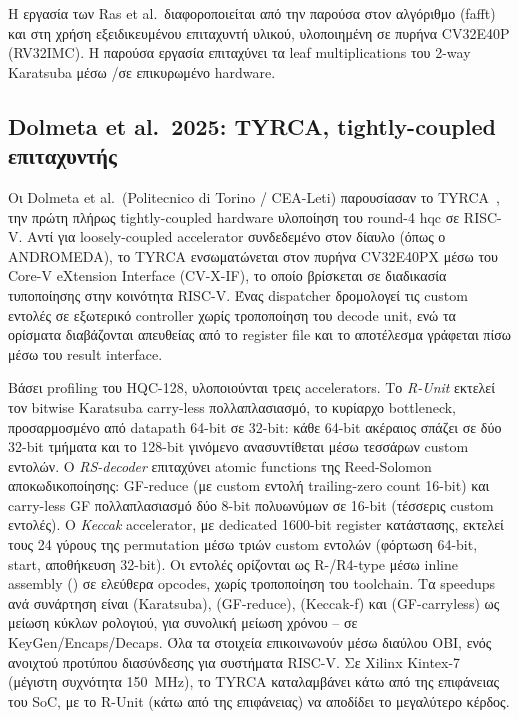 Η εργασία των Ras et al.\ διαφοροποιείται από την παρούσα στον αλγόριθμο (\gls{fafft}) και στη
χρήση εξειδικευμένου επιταχυντή υλικού, υλοποιημένη σε πυρήνα CV32E40P
(RV32IMC). Η παρούσα εργασία επιταχύνει τα leaf multiplications του 2-way
Karatsuba μέσω /\vclmul σε επικυρωμένο hardware.

\subsection{Dolmeta et al.\ 2025: TYRCA, tightly-coupled επιταχυντής}
\label{ssec:rw-tyrca}

Οι Dolmeta et al.\ (Politecnico di Torino / CEA-Leti) παρουσίασαν το
TYRCA~\cite{Dolmeta2025-TYRCA}, την πρώτη πλήρως tightly-coupled hardware
υλοποίηση του round-4 \gls{hqc} σε RISC-V. Αντί για loosely-coupled accelerator
συνδεδεμένο στον δίαυλο (όπως ο ANDROMEDA), το TYRCA
ενσωματώνεται στον πυρήνα CV32E40PX μέσω του Core-V eXtension Interface
(CV-X-IF), το οποίο βρίσκεται σε διαδικασία τυποποίησης στην κοινότητα RISC-V. Ένας
dispatcher δρομολογεί τις custom εντολές σε εξωτερικό controller χωρίς
τροποποίηση του decode unit, ενώ τα ορίσματα διαβάζονται απευθείας από το
register file και το αποτέλεσμα γράφεται πίσω μέσω του result interface.

Βάσει profiling του HQC-128, υλοποιούνται τρεις accelerators. Το \emph{R-Unit}
εκτελεί τον bitwise Karatsuba carry-less πολλαπλασιασμό, το κυρίαρχο bottleneck, 
προσαρμοσμένο από datapath 64-bit σε
32-bit: κάθε 64-bit ακέραιος σπάζει σε δύο 32-bit τμήματα και το 128-bit
γινόμενο ανασυντίθεται μέσω τεσσάρων custom εντολών. Ο \emph{RS-decoder}
επιταχύνει atomic functions της Reed-Solomon αποκωδικοποίησης: GF-reduce (με
custom εντολή trailing-zero count 16-bit) και carry-less GF πολλαπλασιασμό δύο
8-bit πολυωνύμων σε 16-bit (τέσσερις custom εντολές). Ο \emph{Keccak}
accelerator, με dedicated 1600-bit register κατάστασης, εκτελεί τους 24 γύρους της
permutation μέσω τριών custom εντολών (φόρτωση 64-bit, start, αποθήκευση
32-bit). Οι εντολές ορίζονται ως R-/R4-type μέσω inline assembly ()
σε ελεύθερα opcodes, χωρίς τροποποίηση του toolchain. Τα speedups ανά
συνάρτηση είναι  (Karatsuba),  (GF-reduce), 
(Keccak-f) και  (GF-carryless) ως μείωση κύκλων ρολογιού, για
συνολική μείωση χρόνου – σε KeyGen/Encaps/Decaps. Όλα τα
στοιχεία επικοινωνούν μέσω διαύλου OBI, ενός ανοιχτού προτύπου διασύνδεσης για
συστήματα RISC-V. Σε Xilinx Kintex-7 (μέγιστη συχνότητα \SI{150}{\mega\hertz}),
το TYRCA καταλαμβάνει κάτω από  της επιφάνειας του SoC, με το R-Unit
(κάτω από  της επιφάνειας) να αποδίδει το μεγαλύτερο κέρδος.

